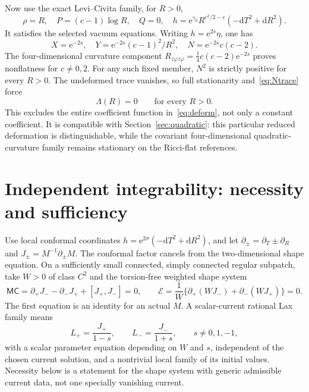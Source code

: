 \documentclass[11pt]{article}
\newcommand{\dd}{\mathrm d}
\newcommand{\MC}{\mathsf{MC}}
\newcommand{\cE}{\mathcal E}
\newcommand{\e}{\mathrm e}
\begin{document}
Now use the exact Levi--Civita family, for $R>0$,
\begin{equation}\label{eq:LC}
 \rho=R,\quad P=(c-1)\log R,\quad Q=0,\quad
 h=\e^{\gamma_0}R^{c^2/2-c}(-\dd T^2+\dd R^2).
\end{equation}
It satisfies the selected vacuum equations. Writing $h=\e^{2s}\eta$, one has
\begin{equation}
 X=\e^{-2s},\quad Y=\e^{-2s}(c-1)^2/R^2,\quad
 N=\e^{-2s}c(c-2).
\end{equation}
The four-dimensional curvature component $R_{z\varphi z\varphi}=\tfrac14c(c-2)\e^{-2s}$ proves nonflatness for $c\ne0,2$. For any such fixed member, $N^2$ is strictly positive for every $R>0$. The undeformed trace vanishes, so full stationarity and~\eqref{eq:Ntrace} force
\begin{equation}
 \Lambda(R)=0\qquad\text{for every }R>0.
\end{equation}
This excludes the entire coefficient function in~\eqref{eq:deform}, not only a constant coefficient. It is compatible with Section~\ref{sec:quadratic}: this particular reduced deformation is distinguishable, while the covariant four-dimensional quadratic-curvature family remains stationary on the Ricci-flat references.

\section{Independent integrability: necessity and sufficiency}\label{sec:lax}

Use local conformal coordinates $h=\e^{2\sigma}(-\dd T^2+\dd R^2)$, and let $\partial_\pm=\partial_T\pm\partial_R$ and $J_\pm=M^{-1}\partial_\pm M$. The conformal factor cancels from the two-dimensional shape equation. On a sufficiently small connected, simply connected regular subpatch, take $W>0$ of class $C^2$ and the torsion-free weighted shape system
\begin{equation}\label{eq:MCe}
 \MC=\partial_+J_--\partial_-J_++[J_+,J_-]=0,\qquad
 \cE=\frac1W\{\partial_+(WJ_-)+\partial_-(WJ_+)\}=0.
\end{equation}
The first equation is an identity for an actual $M$. A scalar-current rational Lax family means
\begin{equation}\label{eq:Lax}
 L_+=\frac{J_+}{1-s},\qquad L_-=\frac{J_-}{1+s},
 \qquad s\ne0,1,-1,
\end{equation}
with a scalar parameter equation depending on $W$ and $s$, independent of the chosen current solution, and a nontrivial local family of its initial values. Necessity below is a statement for the shape system with generic admissible current data, not one specially vanishing current.
\end{document}
